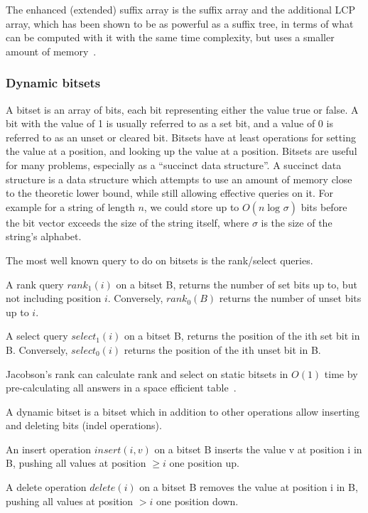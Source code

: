 The enhanced (extended) suffix array is the suffix array and the additional LCP array,
which has been shown to be as powerful as a suffix tree, in terms of what can be computed
with it with the same time complexity, but uses a smaller amount of
memory~\cite{ReplaceSuffixTreeWithEnchancedSuffixArray}.

 \subsubsection{Dynamic bitsets}

A bitset is an array of bits, each bit representing either the value true or false. A bit
with the value of 1 is usually referred to as a set bit, and a value of 0 is referred to
as an unset or cleared bit. Bitsets have at least operations for setting the value at a
position, and looking up the value at a position. Bitsets are useful for many problems,
especially as a ``succinct data structure''. A succinct data structure is a data structure
which attempts to use an amount of memory close to the theoretic lower bound, while still
allowing effective queries on it. For example for a string of length $n$, we could store
up to $O(n \log_{}\sigma)$ bits before the bit vector exceeds the size of the string
itself, where $\sigma$ is the size of the string's alphabet.

The most well known query to do on bitsets is the rank/select queries.

\begin{definition}
    A rank query $rank_1(i)$ on a bitset B, returns the number of set bits
    up to, but not including position $i$. Conversely, $rank_0(B)$ returns the number of
    unset bits up to $i$.
\end{definition}
\begin{definition}
    A select query $select_1(i)$ on a bitset B, returns the position of the ith
    set bit in B. Conversely, $select_0(i)$ returns the position of the ith unset bit in
    B.
\end{definition}

Jacobson's rank can calculate rank and select on static bitsets in $O(1)$ time by
pre-calculating all answers in a space efficient table~\cite{JacobsonsRank}.

\begin{definition}
    A dynamic bitset is a bitset which in addition to other operations allow inserting and
    deleting bits (indel operations).

    An insert operation $insert(i, v)$ on a bitset B inserts the value v at position i in
    B, pushing all values at position $\geq i$ one position up.

    A delete operation $delete(i)$ on a bitset B removes the value at position i in B, pushing all
    values at position $> i$ one position down.
\end{definition}

